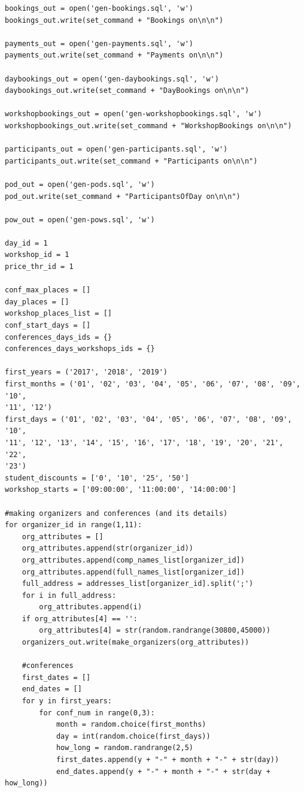 \documentclass[12pt, a4paper]{mwrep}
\begin{document}
\begin{lstlisting}
bookings_out = open('gen-bookings.sql', 'w')
bookings_out.write(set_command + "Bookings on\n\n")

payments_out = open('gen-payments.sql', 'w')
payments_out.write(set_command + "Payments on\n\n")

daybookings_out = open('gen-daybookings.sql', 'w')
daybookings_out.write(set_command + "DayBookings on\n\n")

workshopbookings_out = open('gen-workshopbookings.sql', 'w')
workshopbookings_out.write(set_command + "WorkshopBookings on\n\n")

participants_out = open('gen-participants.sql', 'w')
participants_out.write(set_command + "Participants on\n\n")

pod_out = open('gen-pods.sql', 'w')
pod_out.write(set_command + "ParticipantsOfDay on\n\n")

pow_out = open('gen-pows.sql', 'w')

day_id = 1
workshop_id = 1
price_thr_id = 1

conf_max_places = []
day_places = []
workshop_places_list = []
conf_start_days = []
conferences_days_ids = {}
conferences_days_workshops_ids = {}

first_years = ('2017', '2018', '2019')
first_months = ('01', '02', '03', '04', '05', '06', '07', '08', '09', '10', 
'11', '12')
first_days = ('01', '02', '03', '04', '05', '06', '07', '08', '09', '10', 
'11', '12', '13', '14', '15', '16', '17', '18', '19', '20', '21', '22', 
'23')
student_discounts = ['0', '10', '25', '50']
workshop_starts = ['09:00:00', '11:00:00', '14:00:00']

#making organizers and conferences (and its details)
for organizer_id in range(1,11):
    org_attributes = []
    org_attributes.append(str(organizer_id))
    org_attributes.append(comp_names_list[organizer_id])
    org_attributes.append(full_names_list[organizer_id])
    full_address = addresses_list[organizer_id].split(';')
    for i in full_address:
        org_attributes.append(i)
    if org_attributes[4] == '':
        org_attributes[4] = str(random.randrange(30800,45000))
    organizers_out.write(make_organizers(org_attributes))
        
    #conferences
    first_dates = []
    end_dates = []
    for y in first_years:
        for conf_num in range(0,3):
            month = random.choice(first_months)
            day = int(random.choice(first_days))
            how_long = random.randrange(2,5)
            first_dates.append(y + "-" + month + "-" + str(day))
            end_dates.append(y + "-" + month + "-" + str(day + how_long))


\end{lstlisting}
\end{document}
